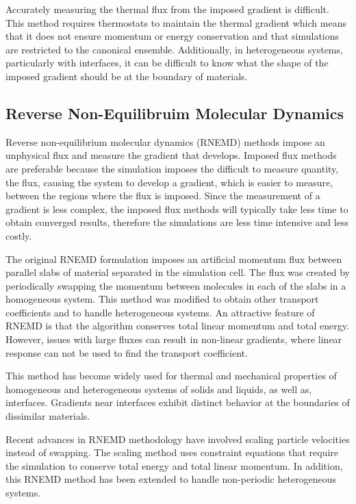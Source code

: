 Accurately measuring the thermal flux from the imposed gradient is difficult.
This method requires thermostats to maintain the thermal gradient which means that it does not ensure momentum or energy conservation and that simulations are restricted to the canonical ensemble.
Additionally, in heterogeneous systems, particularly with interfaces, it can be difficult to know what the shape of the imposed gradient should be at the boundary of materials.

\subsection{Reverse Non-Equilibruim Molecular Dynamics}
Reverse non-equilibrium molecular dynamics (RNEMD) methods impose an unphysical flux and measure the gradient that develops.\cite{Muller-Plathe:1997wq,Muller-Plathe:1999ao,Kuang:2012fe}
Imposed flux methods are preferable because the simulation imposes the difficult to measure quantity, the flux, causing the system to develop a gradient, which is easier to measure, between the regions where the flux is imposed. 
Since the measurement of a gradient is less complex, the imposed flux methods will typically take less time to obtain converged results, therefore the simulations are less time intensive and less costly.

The original RNEMD formulation imposes an artificial momentum flux between parallel slabs of material separated in the simulation cell. The flux was created by periodically swapping the momentum between molecules in each of the slabs in a homogeneous system.\cite{Muller-Plathe:1997wq} 
This method was modified to obtain other transport coefficients \cite{Muller-Plathe:1999ao} and to handle heterogeneous systems.\cite{Muller-plathe:2005} 
An attractive feature of RNEMD is that the algorithm conserves total linear momentum and total energy.
However, issues with large fluxes can result in non-linear gradients, where linear response can not be used to find the transport coefficient.\cite{Tenney:2010rp}

This method has become widely used for thermal and mechanical properties of homogeneous and heterogeneous systems of solids and liquids\cite{Muller-Plathe:1997wq,Muller-Plathe:1999ao, Tenney:2010rp}, as well as, interfaces.\cite{Patel:2005zm, Shenogina:2009ix,Kuang:2011ef, Stocker:2013cl}
Gradients near interfaces exhibit distinct behavior at the boundaries of dissimilar materials.

Recent advances in RNEMD methodology have involved scaling particle velocities instead of swapping. The scaling method uses constraint equations that require the simulation to conserve total energy and total linear momentum.\cite{Kuang:2011ef, Kuang:2012fe}
In addition, this RNEMD method has been extended to handle non-periodic heterogeneous systems.\cite{Stocker:2014qq}

